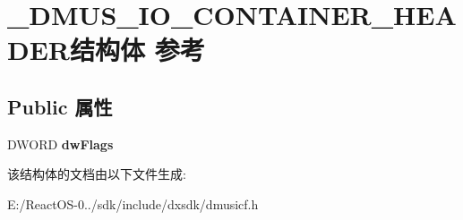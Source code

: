 \hypertarget{struct___d_m_u_s___i_o___c_o_n_t_a_i_n_e_r___h_e_a_d_e_r}{}\section{\+\_\+\+D\+M\+U\+S\+\_\+\+I\+O\+\_\+\+C\+O\+N\+T\+A\+I\+N\+E\+R\+\_\+\+H\+E\+A\+D\+E\+R结构体 参考}
\label{struct___d_m_u_s___i_o___c_o_n_t_a_i_n_e_r___h_e_a_d_e_r}
\subsection*{Public 属性}
\begin{DoxyCompactItemize}
\item 
\mbox{\label{struct___d_m_u_s___i_o___c_o_n_t_a_i_n_e_r___h_e_a_d_e_r_a9c4ac1f4a3287df887d185494ccf6d68}} 
D\+W\+O\+RD {\bfseries dw\+Flags}
\end{DoxyCompactItemize}


该结构体的文档由以下文件生成\+:\begin{DoxyCompactItemize}
\item 
E\+:/\+React\+O\+S-\/0../sdk/include/dxsdk/dmusicf.\+h\end{DoxyCompactItemize}
